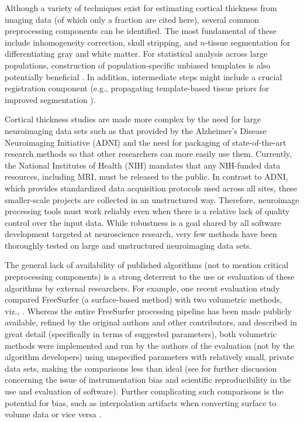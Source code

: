Although a variety of techniques exist for estimating cortical
thickness from imaging data (of which only a fraction are cited here),
several common preprocessing components can be identified.  The most
fundamental of these include inhomogeneity correction, skull
stripping, and $n$-tissue segmentation for differentiating gray and
white matter.  For statistical analysis across large populations,
construction of population-specific unbiased templates is also
potentially beneficial \citep{evans2012}.  In addition, intermediate
steps might include a crucial registration component (e.g.,
propagating template-based tissue priors for improved segmentation \citep{ashburner2005}).

Cortical thickness studies are made more complex by the need for large
neuroimaging data sets such as that provided by the Alzheimer's
Disease Neuroimaging Initiative (ADNI) \citep{Weiner2012} and the need
for packaging of state-of-the-art research methods so that other
researchers can more easily use them.  Currently, the National
Institutes of Health (NIH) mandates that any NIH-funded data
resources, including MRI, must be released to the public.  In contrast
to ADNI, which provides standardized data acquisition protocols used
across all sites, these smaller-scale projects are collected in an
unstructured way.  Therefore, neuroimage processing tools must
work reliably even when there is a relative lack of quality
control over the input data.  While robustness is a goal shared by all
software development targeted at neuroscience research, very few
methods have been thoroughly tested on large and unstructured
neuroimaging data sets.


The general lack of availability of published
algorithms \citep{kovacevic2006} (not to mention critical preprocessing
components) is a strong deterrent to the use or evaluation of these algorithms
by external researchers.  For example, one recent evaluation
study \citep{clarkson2011} compared
FreeSurfer (a surface-based method) with two volumetric methods, viz., \cite{jones2000,das2009}.
Whereas the entire FreeSurfer processing pipeline has been made publicly available, 
refined by the original authors and other contributors, and described in great detail 
(specifically in terms of suggested parameters), both volumetric methods were
implemented and run by the authors of the evaluation (not by the algorithm developers)
using unspecified parameters with relatively small, private data sets,
making the comparisons less than ideal (see \cite{tustison2013} for further discussion
concerning the issue of instrumentation bias and scientific reproducibility in the use and evaluation of software).
Further complicating such comparisons is the potential for bias, such as interpolation artifacts when
converting surface to volume data or vice versa \citep{klein2010}.

